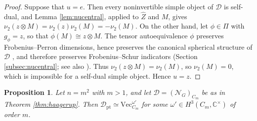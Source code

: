 \documentclass[10pt]{article}
\theoremstyle{plain}
\newtheorem{proposition}[theorem]{Proposition}
\theoremstyle{definition}
\theoremstyle{plain}
\begin{document}
\begin{proof}
Suppose that $u=e$. Then every noninvertible simple object of $\mathcal{D}$ is self-dual, and Lemma \ref{lem:nucentral}, applied to $\widehat{Z}$ and $M$, gives $\nu_2(z\otimes M)=\nu_2(z)\nu_2(M)=-\nu_2(M)$. On the other hand, let $\phi\in\Pi$ with $g_\phi=z$, so that $\phi(M)\cong z\otimes M$. The tensor autoequivalence $\phi$ preserves Frobenius--Perron dimensions, hence preserves the canonical spherical structure of $\mathcal{D}$ \cite[Proposition 9.5.1]{MR3242743}, and therefore preserves Frobenius--Schur indicators (Section \ref{subsec:nucentral}; see also \cite[Section 6]{MR2381536}). Thus $\nu_2(z\otimes M)=\nu_2(M)$, so $\nu_2(M)=0$, which is impossible for a self-dual simple object. Hence $u=z$.
\end{proof}

\begin{proposition}\label{prop:Dpt}
Let $n=m^2$ with $m>1$, and let $\mathcal{D}=(\mathcal{N}_G)_{C_m}$ be as in Theorem \ref{thm:haagerup}. Then $\mathcal{D}_\mathrm{pt}\simeq\mathrm{Vec}^{\omega'}_{C_m}$ for some $\omega'\in H^3(C_m,\mathbb{C}^\times)$ of order $m$.
\end{proposition}
\end{document}
